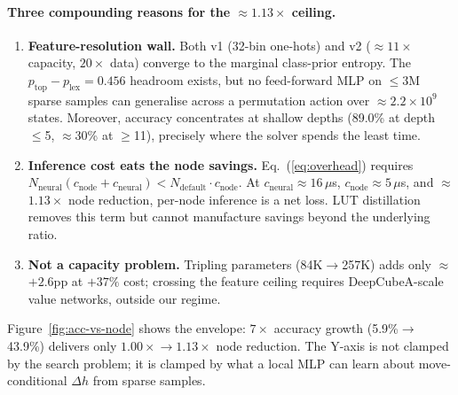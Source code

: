 \documentclass[graybox]{svmult}
\begin{document}
\paragraph{Three compounding reasons for the $\approx$$1.13\times$ ceiling.}
\begin{enumerate}[leftmargin=*, itemsep=0.2em]
  \item \textbf{Feature-resolution wall.} Both v1 (32-bin one-hots) and v2 ($\approx$$11\times$ capacity, $20\times$ data) converge to the marginal class-prior entropy. The $p_{\text{top}} - p_{\text{lex}} = 0.456$ headroom exists, but no feed-forward MLP on $\leq$$3$M sparse samples can generalise across a permutation action over $\approx$$2.2{\times}10^9$ states. Moreover, accuracy concentrates at shallow depths (89.0\% at depth $\leq$5, $\approx$30\% at $\geq$11), precisely where the solver spends the least time.
  \item \textbf{Inference cost eats the node savings.} Eq.~(\ref{eq:overhead}) requires $N_{\text{neural}}(c_{\text{node}} + c_{\text{neural}}) < N_{\text{default}} \cdot c_{\text{node}}$. At $c_{\text{neural}} \approx 16\,\mu$s, $c_{\text{node}} \approx 5\,\mu$s, and $\approx$$1.13\times$ node reduction, per-node inference is a net loss. LUT distillation removes this term but cannot manufacture savings beyond the underlying ratio.
  \item \textbf{Not a capacity problem.} Tripling parameters (84K$\to$257K) adds only $\approx$$+2.6$pp at $+37\%$ cost; crossing the feature ceiling requires DeepCubeA-scale value networks, outside our regime.
\end{enumerate}

Figure~\ref{fig:acc-vs-node} shows the envelope: $7\times$ accuracy growth (5.9\%$\to$43.9\%) delivers only $1.00\times$$\to$$1.13\times$ node reduction. The Y-axis is not clamped by the search problem; it is clamped by what a local MLP can learn about move-conditional $\Delta h$ from sparse samples.
\end{document}

